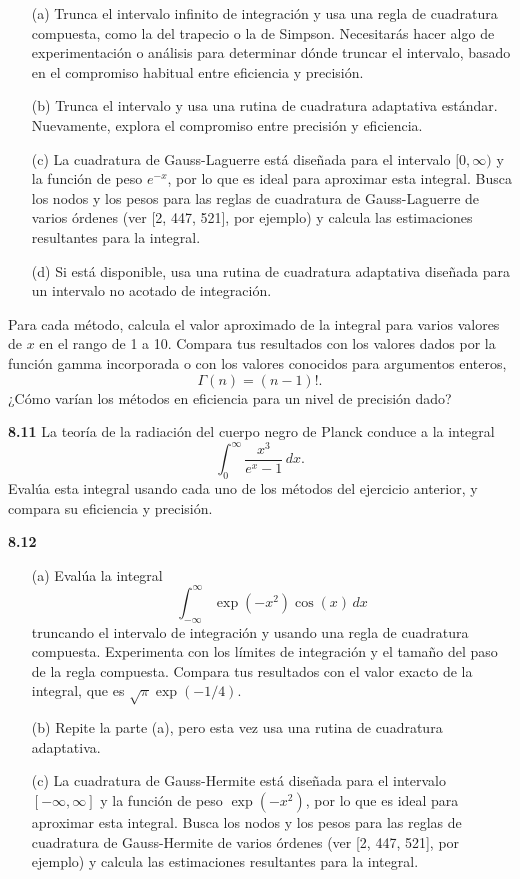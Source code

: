 \documentclass{article}
\begin{document}
\begin{itemize}
    \item[(a)] Trunca el intervalo infinito de integración y usa una regla de cuadratura compuesta, como la del trapecio o la de Simpson. Necesitarás hacer algo de experimentación o análisis para determinar dónde truncar el intervalo, basado en el compromiso habitual entre eficiencia y precisión.
    
    \item[(b)] Trunca el intervalo y usa una rutina de cuadratura adaptativa estándar. Nuevamente, explora el compromiso entre precisión y eficiencia.
    
    \item[(c)] La cuadratura de Gauss-Laguerre está diseñada para el intervalo \([0, \infty)\) y la función de peso \(e^{-x}\), por lo que es ideal para aproximar esta integral. Busca los nodos y los pesos para las reglas de cuadratura de Gauss-Laguerre de varios órdenes (ver [2, 447, 521], por ejemplo) y calcula las estimaciones resultantes para la integral.
    
    \item[(d)] Si está disponible, usa una rutina de cuadratura adaptativa diseñada para un intervalo no acotado de integración.
\end{itemize}

Para cada método, calcula el valor aproximado de la integral para varios valores de \(x\) en el rango de 1 a 10. Compara tus resultados con los valores dados por la función gamma incorporada o con los valores conocidos para argumentos enteros,
\[
\Gamma(n) = (n - 1)!.
\]
¿Cómo varían los métodos en eficiencia para un nivel de precisión dado?

\textbf{8.11} La teoría de la radiación del cuerpo negro de Planck conduce a la integral
\[
\int_0^\infty \frac{x^3}{e^x - 1} \, dx.
\]
Evalúa esta integral usando cada uno de los métodos del ejercicio anterior, y compara su eficiencia y precisión.

\textbf{8.12}
\begin{itemize}
    \item[(a)] Evalúa la integral
    \[
    \int_{-\infty}^\infty \exp(-x^2) \cos(x) \, dx
    \]
    truncando el intervalo de integración y usando una regla de cuadratura compuesta. Experimenta con los límites de integración y el tamaño del paso de la regla compuesta. Compara tus resultados con el valor exacto de la integral, que es \(\sqrt{\pi} \exp(-1/4)\).
    
    \item[(b)] Repite la parte (a), pero esta vez usa una rutina de cuadratura adaptativa.
    \item[(c)] La cuadratura de Gauss-Hermite está diseñada para el intervalo \([-\infty, \infty]\) y la función de peso \(\exp(-x^2)\), por lo que es ideal para aproximar esta integral. Busca los nodos y los pesos para las reglas de cuadratura de Gauss-Hermite de varios órdenes (ver [2, 447, 521], por ejemplo) y calcula las estimaciones resultantes para la integral.
\end{itemize}
\end{document}
